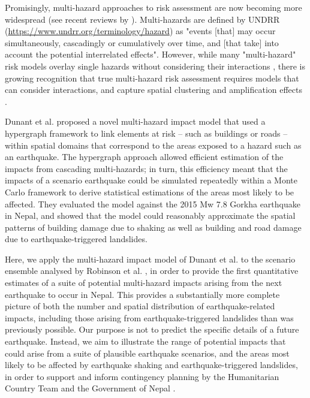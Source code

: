 \documentclass[preprint,12pt,authoryear]{elsarticle}
\begin{document}
Promisingly, multi-hazard approaches to risk assessment are now becoming more widespread (see recent reviews by \cite{Gill2022,Ward2022}). Multi-hazards are defined by UNDRR (\url{https://www.undrr.org/terminology/hazard}) as "events [that] may occur simultaneously, cascadingly or cumulatively over time, and [that take] into account the potential interrelated effects". However, while many "multi-hazard" risk models overlay single hazards without considering their interactions \citep{Gill2014}, there is growing recognition that true multi-hazard risk assessment requires models that can consider interactions, and capture spatial clustering and  amplification effects \citep{Mignan2014,Tilloy2019,Dunant2021,Ming2022,Hochrainer-Stigler2023}.

Dunant et al. \citep{Dunant2025} proposed a novel multi-hazard impact model that used a hypergraph framework to link elements at risk -- such as buildings or roads -- within spatial domains that correspond to the areas exposed to a hazard such as an earthquake. The hypergraph approach allowed efficient estimation of the impacts from cascading multi-hazards; in turn, this efficiency meant that the impacts of a scenario earthquake could be simulated repeatedly within a Monte Carlo framework to derive statistical estimations of the areas most likely to be affected. They evaluated the model against the 2015 Mw 7.8 Gorkha earthquake in Nepal, and showed that the model could reasonably approximate the spatial patterns of building damage due to shaking as well as building and road damage due to earthquake-triggered landslides.

Here, we apply the multi-hazard impact model of Dunant et al. \citep{Dunant2025} to the scenario ensemble analysed by Robinson et al. \citep{Robinson2018}, in order to provide the first quantitative estimates of a suite of potential multi-hazard impacts arising from the next earthquake to occur in Nepal. This provides a substantially more complete picture of both the number and spatial distribution of earthquake-related impacts, including those arising from earthquake-triggered landslides than was previously possible. Our purpose is not to predict the specific details of a future earthquake. Instead, we aim to illustrate the range of potential impacts that could arise from a suite of plausible earthquake scenarios, and the areas most likely to be affected by earthquake shaking and earthquake-triggered landslides, in order to support and inform contingency planning by the Humanitarian Country Team and the Government of Nepal \citep{Sijapati2024}.
\end{document}

